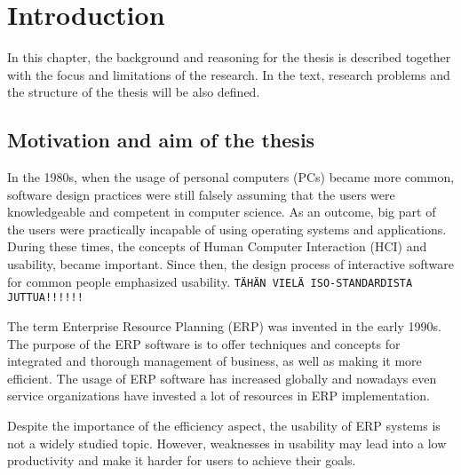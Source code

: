 \documentclass[12pt,a4paper,oneside,pdftex]{report}
\begin{document}
\pagestyle{headings}


% 

\chapter{Introduction}
\label{chapter:introduction}
In this chapter, the background and reasoning for the thesis is described together with the focus and limitations of the research. In the text, research problems and the structure of the thesis will be also defined. 

\section{Motivation and aim of the thesis}
\label{sec:motivationandaim}
In the 1980s, when the usage of personal computers (PCs) became more common, software design practices were still falsely assuming that the users were knowledgeable and competent in computer science. As an outcome, big part of the users were practically incapable of using operating systems and applications.
During these times, the concepts of Human Computer Interaction (HCI) and usability, became important. Since then, the design process of interactive software for common people emphasized usability. \cite{RefWorks:9} \texttt{TÄHÄN VIELÄ ISO-STANDARDISTA JUTTUA!!!!!!}

The term Enterprise Resource Planning (ERP) was invented in the early 1990s.\cite{RefWorks:3} The purpose of the ERP software is to offer techniques and concepts for integrated and thorough management of business, as well as making it more efficient.
The usage of ERP software has increased globally and nowadays even service organizations have invested a lot of resources in ERP implementation.\cite{RefWorks:1, RefWorks:7} 

Despite the importance of the efficiency aspect, the usability of ERP systems is not a widely studied topic. However, weaknesses in usability may lead into a low productivity and make it harder for users to achieve their goals.\cite{RefWorks:2} 
\end{document}
